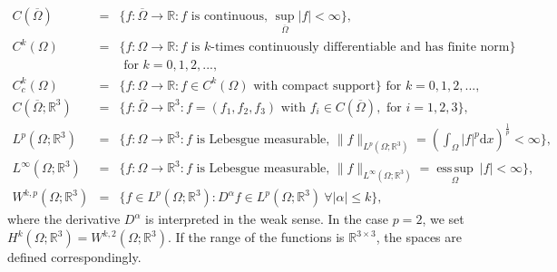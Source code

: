 \documentclass{article}
\def\d{\mathrm{d}}
\begin{document}
\begin{eqnarray}
C\left(\overline{\Omega}\right)&=& \bigg\{f:\overline{\Omega}\rightarrow\mathbb R: f \mbox{ is continuous, } \sup_{\overline{\Omega}}|f|<\infty  \bigg\},\nonumber\\
C^k\left(\Omega\right)&=& \bigg\{f:\Omega\rightarrow\mathbb R: f \mbox{ is } k\mbox{-times continuously differentiable and has finite norm}  \bigg\} \nonumber \\ && \mbox{ for } k=0,1,2,..., \nonumber\\
C^{k}_{c}\left(\Omega\right)&=& \bigg\{f:\Omega\rightarrow\mathbb R: f\in C^k\left(\Omega\right) \mbox{ with compact support}\bigg\} \mbox{ for } k=0,1,2,..., \nonumber\\
C\left(\overline{\Omega}; \mathbb R^3\right)&=& \bigg\{f:\bar{\Omega}\rightarrow\mathbb R^3: f=\left(f_1, f_2, f_3\right) \mbox{ with } f_i\in C\left(\overline{\Omega}\right), \mbox{ for } i=1,2,3 \bigg\},\nonumber\\
L^p\left(\Omega; \mathbb R^3\right) &=& \bigg\{f:\Omega\rightarrow\mathbb R^3: f \mbox{ is Lebesgue measurable, } \|f\|_{L^p(\Omega ;\mathbb{R}^3)}=\left(\int_{\Omega}|f|^p\d x\right)^{\frac{1}{p}}<\infty \bigg\},\nonumber\\
L^{\infty}\left(\Omega; \mathbb R^3\right) &=& \bigg\{f:\Omega\rightarrow\mathbb R^3: f \mbox{ is Lebesgue measurable, } \|f\|_{L^\infty(\Omega; \mathbb{R}^3)} = \operatorname*{ess\,sup}_{\Omega}~|f|<\infty \bigg\},\nonumber\\
W^{k,p}\left(\Omega; \mathbb R^3\right)&=&\bigg\{f\in L^p\left(\Omega; \mathbb R^3\right): D^{\alpha}f\in L^p\left(\Omega; \mathbb R^3\right)~\forall |\alpha|\le k\bigg\}\nonumber,
\end{eqnarray}
where the derivative $D^{\alpha}$ is interpreted in the weak sense. \sloppy In the case $p=2$, we set $H^k\left(\Omega; \mathbb R^3\right)=W^{k,2}\left(\Omega; \mathbb R^3\right).$ If the range of the functions is $\mathbb{R}^{3\times 3}$, the spaces are defined correspondingly.
\end{document}
